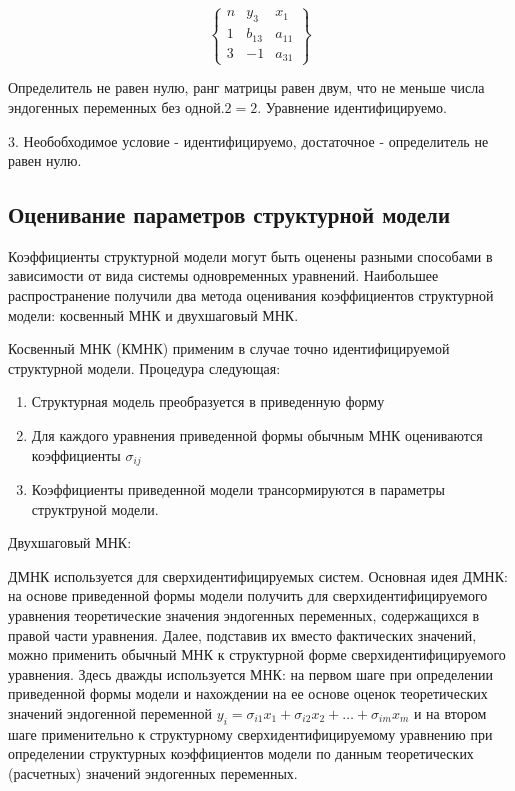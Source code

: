 \documentclass[aps,%
12pt,%
final,%
oneside,
onecolumn,%
musixtex, %
superscriptaddress,%
centertags]{article} %
\begin{document}
$$\left \{
\begin{matrix}
	n & y_3 & x_1 \\
	1 & b_{13} & a_{11} \\
	3 & -1 & a_{31} 

\end{matrix}
\right \}
$$

Определитель не равен нулю, ранг матрицы равен двум, что не меньше числа эндогенных переменных без одной.$2=2$. Уравнение идентифицируемо.

3. Необобходимое условие - идентифицируемо, достаточное - определитель не равен нулю.

\subsection{Оценивание параметров структурной модели}

Коэффициенты структурной модели могут быть оценены разными способами в зависимости от вида системы одновременных
уравнений. Наибольшее распространение получили два метода оценивания коэффициентов структурной модели: косвенный МНК и
двухшаговый МНК.

Косвенный МНК (КМНК) применим в случае точно идентифицируемой структурной модели. Процедура следующая:

\begin{enumerate}
	\item Структурная модель преобразуется в приведенную форму
	\item Для каждого уравнения приведенной формы обычным МНК оцениваются коэффициенты $\sigma_{ij}$
	\item Коэффициенты приведенной модели трансормируются в параметры структруной модели.
\end{enumerate}

Двухшаговый МНК:

ДМНК используется для сверхидентифицируемых систем. Основная идея ДМНК: на основе приведенной формы
модели получить для сверхидентифицируемого уравнения теоретические значения эндогенных переменных, содержащихся в правой части уравнения. Далее, подставив их вместо фактических значений, можно применить обычный МНК к структурной форме сверхидентифицируемого уравнения. Здесь дважды используется МНК: на первом шаге при определении приведенной формы модели и нахождении на ее основе оценок теоретических значений эндогенной переменной $y_i = \sigma_{i1}x_1 + \sigma_{i2}x_2 + \ldots + \sigma_{im}x_m $ и на втором шаге применительно к структурному сверхидентифицируемому уравнению при определении
структурных коэффициентов модели по данным теоретических (расчетных) значений эндогенных переменных.
\end{document}
